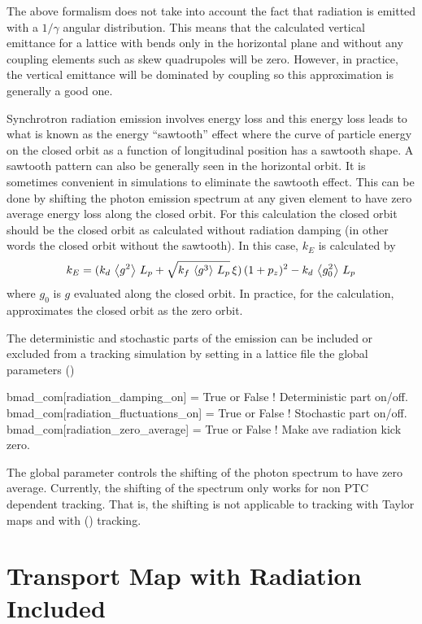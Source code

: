 The above formalism does not take into account the fact that radiation is emitted with a $1/\gamma$
angular distribution. This means that the calculated vertical emittance for a lattice with bends
only in the horizontal plane and without any coupling elements such as skew quadrupoles will be
zero. However, in practice, the vertical emittance will be dominated by coupling so this
approximation is generally a good one.

Synchrotron radiation emission involves energy loss and this energy loss leads to what is known as
the energy ``sawtooth'' effect where the curve of particle energy on the closed orbit as a function
of longitudinal position has a sawtooth shape. A sawtooth pattern can also be generally seen in the
horizontal orbit. It is sometimes convenient in simulations to eliminate the sawtooth effect. This
can be done by shifting the photon emission spectrum at any given element to have zero average
energy loss along the closed orbit. For this calculation the closed orbit should be the closed orbit
as calculated without radiation damping (in other words the closed orbit without the sawtooth). In
this case, $k_E$ is calculated by
\begin{equation}
  k_E = (k_d \, \left\langle g^2 \right\rangle \, L_p + \sqrt{k_f \, \left\langle g^3 \right\rangle \, L_p} \, \xi) \, (1 + p_z)^2 - 
  k_d \, \left\langle g_0^2 \right\rangle \, L_p
\end{equation}
where $g_0$ is $g$ evaluated along the closed orbit. In practice, for the calculation, \bmad
approximates the closed orbit as the zero orbit. 

The deterministic and stochastic parts of the emission can be included or excluded from a tracking
simulation by setting in a lattice file the \bmad global parameters ()
\begin{example}
  bmad_com[radiation_damping_on]      = True or False  ! Deterministic part on/off.
  bmad_com[radiation_fluctuations_on] = True or False  ! Stochastic part on/off.
  bmad_com[radiation_zero_average]    = True or False  ! Make ave radiation kick zero.
\end{example}
The global parameter  controls the shifting of the photon
spectrum to have zero average. Currently, the shifting of the spectrum only works for non PTC
dependent tracking. That is, the shifting is not applicable to tracking with Taylor maps and with
 () tracking.

\section{Transport Map with Radiation Included}
\label{s:map.rad}

